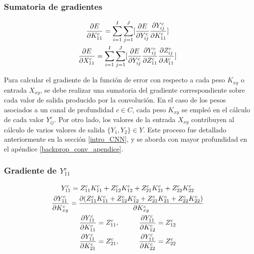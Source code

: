 \subsubsection{Sumatoria de gradientes}

\begin{gather}
	\frac{\partial E}{\partial K^c_{11}} = \sum_{i=1}^{I}\sum_{j=1}^{J}  [\frac{\partial E}{\partial Y^c_{ij}} \frac{\partial Y^c_{ij}}{\partial K^c_{11}}] \notag \\
	\frac{\partial E}{\partial X^c_{11}} = \sum_{i=1}^{I}\sum_{j=1}^{J}  [\frac{\partial E}{\partial Y^c_{ij}} \frac{\partial Y^c_{ij}}{\partial Z^c_{11}} \frac{\partial Z^c_{ij}}{\partial A^c_{11}}] \notag 
\end{gather}

Para calcular el gradiente de la función de error con respecto a cada peso ${K_{xy}}$ o entrada ${X_{xy}}$, se debe realizar una sumatoria del gradiente correspondiente sobre cada valor de salida producido por la convolución. En el caso de los pesos asociados a un canal de profundidad $c \in C$, cada peso ${K_{xy}}$ se empleó en el cálculo de cada valor $Y^c_{ij}$. Por otro lado, los valores de la entrada ${X_{xy}}$ contribuyen al cálculo de varios valores de salida $\{Y_1, Y_2\} \in Y$. Este proceso fue detallado anteriormente en la sección \ref{intro_CNN}, y se aborda con mayor profundidad en el apéndice \ref{backprop_conv_apendice}.

\subsubsection{Gradiente de $Y^c_{11}$}

\begin{gather}
	Y^c_{11} = Z^c_{11} K^c_{11} + Z^c_{12} K^c_{12} + Z^c_{21} K^c_{21} + Z^c_{22} K^c_{22} \label{grad_y11_k_11} \\
	\frac{\partial Y^c_{11}}{\partial K^c_{xy}} = \frac{\partial (Z^c_{11} K^c_{11} + Z^c_{12} K^c_{12} + Z^c_{21} K^c_{21} + Z^c_{22} K^c_{22})}{\partial K^c_{xy}} \label{grad_y11_k_12} \\
	\frac{\partial Y^c_{11}}{\partial K^c_{11}} = Z^c_{11}, \hspace{10mm} \frac{\partial Y^c_{11}}{\partial K^c_{12}} = Z^c_{12} \label{grad_y11_k_21}\\
	\frac{\partial Y^c_{11}}{\partial K^c_{21}} = Z^c_{21}, \hspace{10mm} \frac{\partial Y^c_{11}}{\partial K^c_{22}} = Z^c_{22} \label{grad_y11_k_22}
\end{gather}

